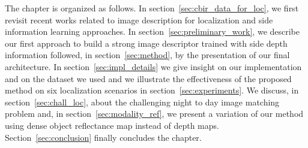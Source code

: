 The chapter is organized as follows. In section~\ref{sec:cbir_data_for_loc}, we first revisit recent works related to image description for localization and side information learning approaches. In section~\ref{sec:preliminary_work}, we describe our first approach to build a strong image descriptor trained with side depth information followed, in section~\ref{sec:method}, by the presentation of our final architecture. In section~\ref{sec:impl_details} we give insight on our implementation and on the dataset we used and we illustrate the effectiveness of the proposed method on six localization scenarios in section~\ref{sec:experiments}. We discuss, in section~\ref{sec:chall_loc}, about the challenging night to day image matching problem and, in section~\ref{sec:modality_ref}, we present a variation of our method using dense object reflectance map instead of depth maps. Section~\ref{sec:conclusion} finally concludes the chapter.

